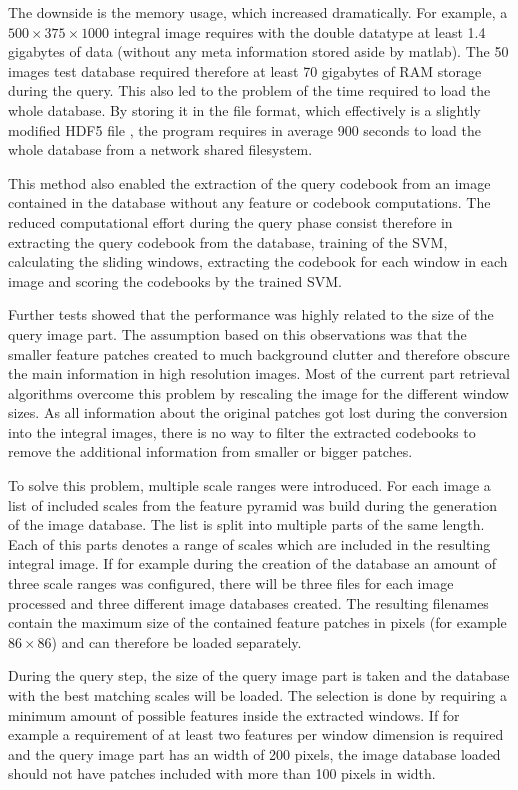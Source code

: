 The downside is the memory usage, which increased dramatically. For example, a $500 \times 375 \times 1000$ integral image requires with the double datatype at least 1.4 gigabytes of data (without any meta information stored aside by matlab). The 50 images test database required therefore at least 70 gigabytes of RAM storage during the query. This also led to the problem of the time required to load the whole database. By storing it in the  file format, which effectively is a slightly modified HDF5 file \cite{hdf5}, the program requires in average 900 seconds to load the whole database from a network shared filesystem.

This method also enabled the extraction of the query codebook from an image contained in the database without any feature or codebook computations. The reduced computational effort during the query phase consist therefore in extracting the query codebook from the database, training of the \ac{SVM}, calculating the sliding windows, extracting the codebook for each window in each image and scoring the codebooks by the trained \ac{SVM}.

Further tests showed that the performance was highly related to the size of the query image part. The assumption based on this observations was that the smaller feature patches created to much background clutter and therefore obscure the main information in high resolution images. Most of the current part retrieval algorithms overcome this problem by rescaling the image for the different window sizes. As all information about the original patches got lost during the conversion into the integral images, there is no way to filter the extracted codebooks to remove the additional information from smaller or bigger patches.

To solve this problem, multiple scale ranges were introduced. For each image a list of included scales from the feature pyramid was build during the generation of the image database. The list is split into multiple parts of the same length. Each of this parts denotes a range of scales which are included in the resulting integral image. If for example during the creation of the database an amount of three scale ranges was configured, there will be three files for each image processed and three different image databases created. The resulting filenames contain the maximum size of the contained feature patches in pixels (for example $86 \times 86$) and can therefore be loaded separately.

During the query step, the size of the query image part is taken and the database with the best matching scales will be loaded. The selection is done by requiring a minimum amount of possible features inside the extracted windows. If for example a requirement of at least two features per window dimension is required and the query image part has an width of 200 pixels, the image database loaded should not have patches included with more than 100 pixels in width.


